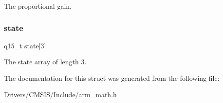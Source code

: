 The proportional gain. \mbox{\label{structarm__pid__instance__q15_a4c4e19d77015f5f7a31a1daf0faf31b6}} 
\subsubsection{\texorpdfstring{state}{state}}
{\footnotesize\ttfamily q15\+\_\+t state\mbox{[}3\mbox{]}}

The state array of length 3. 

The documentation for this struct was generated from the following file\+:\begin{DoxyCompactItemize}
\item 
Drivers/\+C\+M\+S\+I\+S/\+Include/arm\+\_\+math.\+h\end{DoxyCompactItemize}
